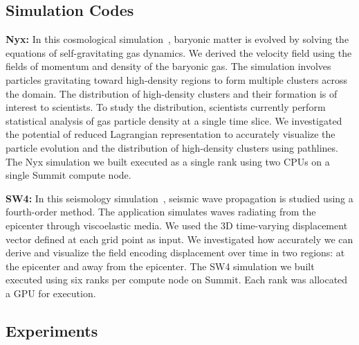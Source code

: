 \documentclass[runningheads]{llncs}
\begin{document}
\vspace{-3mm}
\subsection{Simulation Codes}
\label{sec:simulations}

\textbf{Nyx:} In this cosmological simulation~\cite{almgren2013nyx}, baryonic matter is evolved by solving the equations of self-gravitating gas dynamics.
%
We derived the velocity field using the fields of momentum and density of the baryonic gas.
%
The simulation involves particles gravitating toward high-density regions to form multiple clusters across the domain.
%
The distribution of high-density clusters and their formation is of interest to scientists.
%
To study the distribution, scientists currently perform statistical analysis of gas particle density at a single time slice.
%
We investigated the potential of reduced Lagrangian representation to accurately visualize the particle evolution and the distribution of high-density clusters using pathlines.
%
%
The Nyx simulation we built executed as a single rank using two CPUs on a single Summit compute node.
%

\noindent\textbf{SW4:} In this seismology simulation~\cite{petersson2015wave}, seismic wave propagation is studied using a fourth-order method.
%
The application simulates waves radiating from the epicenter through viscoelastic media.
%
%
We used the 3D time-varying displacement vector defined at each grid point as input.
%
We investigated how accurately we can derive and visualize the field encoding displacement over time in two regions: at the epicenter and away from the epicenter.
%
The SW4 simulation we built executed using six ranks per compute node on Summit. Each rank was allocated a GPU for execution.
%

%
\vspace{-3mm}
\subsection{Experiments}
\label{sec:experiments}
\end{document}
